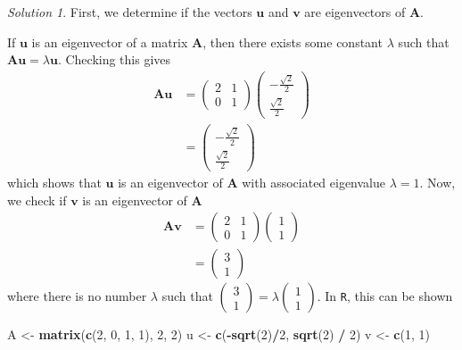 \documentclass[
]{book}
\newenvironment{Shaded}{\begin{snugshade}}{\end{snugshade}}
\newcommand{\DecValTok}[1]{\textcolor[rgb]{0.00,0.00,0.81}{#1}}
\newcommand{\KeywordTok}[1]{\textcolor[rgb]{0.13,0.29,0.53}{\textbf{#1}}}
\newcommand{\NormalTok}[1]{#1}
\newcommand{\OperatorTok}[1]{\textcolor[rgb]{0.81,0.36,0.00}{\textbf{#1}}}
\newcommand{\StringTok}[1]{\textcolor[rgb]{0.31,0.60,0.02}{#1}}
\theoremstyle{definition}
\theoremstyle{definition}
\theoremstyle{definition}
\theoremstyle{definition}
\theoremstyle{remark}
\newtheorem*{solution}{Solution}
\begin{document}
\begin{solution}
First, we determine if the vectors \(\mathbf{u}\) and \(\mathbf{v}\) are eigenvectors of \(\mathbf{A}\).

If \(\mathbf{u}\) is an eigenvector of a matrix \(\mathbf{A}\), then there exists some constant \(\lambda\) such that \(\mathbf{A} \mathbf{u} = \lambda \mathbf{u}\). Checking this gives
\[
\begin{aligned}
\mathbf{A} \mathbf{u} & = \begin{pmatrix} 2 & 1 \\ 0 & 1 \end{pmatrix} \begin{pmatrix} - \frac{\sqrt{2}}{2} \\ \frac{\sqrt{2}}{2} \end{pmatrix} \\
& = \begin{pmatrix} - \frac{\sqrt{2}}{2} \\ \frac{\sqrt{2}}{2} \end{pmatrix} 
\end{aligned}
\]
which shows that \(\mathbf{u}\) is an eigenvector of \(\mathbf{A}\) with associated eigenvalue \(\lambda = 1\). Now, we check if \(\mathbf{v}\) is an eigenvector of \(\mathbf{A}\)
\[
\begin{aligned}
\mathbf{A} \mathbf{v} & = \begin{pmatrix} 2 & 1 \\ 0 & 1 \end{pmatrix} \begin{pmatrix} 1 \\ 1 \end{pmatrix} \\
& = \begin{pmatrix} 3 \\ 1 \end{pmatrix} 
\end{aligned}
\]
where there is no number \(\lambda\) such that \(\begin{pmatrix} 3 \\ 1 \end{pmatrix} = \lambda \begin{pmatrix} 1 \\ 1 \end{pmatrix}\). In \texttt{R}, this can be shown

\begin{Shaded}
\begin{Highlighting}[]
\NormalTok{A <-}\StringTok{ }\KeywordTok{matrix}\NormalTok{(}\KeywordTok{c}\NormalTok{(}\DecValTok{2}\NormalTok{, }\DecValTok{0}\NormalTok{, }\DecValTok{1}\NormalTok{, }\DecValTok{1}\NormalTok{), }\DecValTok{2}\NormalTok{, }\DecValTok{2}\NormalTok{)}
\NormalTok{u <-}\StringTok{ }\KeywordTok{c}\NormalTok{(}\OperatorTok{-}\KeywordTok{sqrt}\NormalTok{(}\DecValTok{2}\NormalTok{)}\OperatorTok{/}\DecValTok{2}\NormalTok{, }\KeywordTok{sqrt}\NormalTok{(}\DecValTok{2}\NormalTok{) }\OperatorTok{/}\StringTok{ }\DecValTok{2}\NormalTok{)}
\NormalTok{v <-}\StringTok{ }\KeywordTok{c}\NormalTok{(}\DecValTok{1}\NormalTok{, }\DecValTok{1}\NormalTok{)}


\end{Highlighting}
\end{Shaded}
\end{solution}
\end{document}
